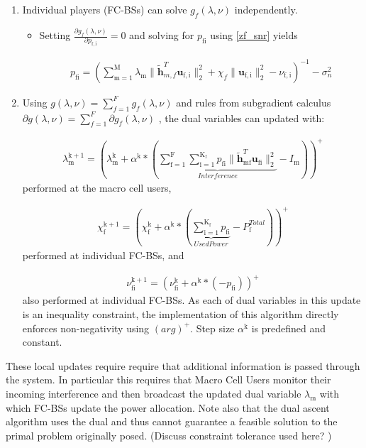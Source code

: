 \documentclass[12pt,a4paper]{report}
\begin{document}
\begin{enumerate}
\item 
Individual players (FC-BSs) can solve $ g_f(\lambda,\nu) $ independently.
\begin{itemize}
\item Setting $\frac{\partial g_f(\lambda,\nu)}{\partial p_{\mathrm{f,i}}} = 0$ 
and solving for $p_{\mathrm{fi}}$ using \eqref{zf_snr} yields

\begin{gather}
p_{\mathrm{fi}} = (\sum_{\mathrm{m=1}}^{\mathrm{M}}\lambda_{\mathrm{m}}\|\mathbf{\tilde{h}}_{m,f}^T \mathbf{u}_{\mathrm{f,i}}\|^2_2
+\chi_{f} \|\mathbf{u}_{\mathrm{f,i}}\|^2_2
-\nu_{\mathrm{f,i}}
 )^{-1}
  - \sigma^2_n
\end{gather}

\end{itemize}
\item 
Using $g(\lambda,\nu) = \sum_{f=1}^{F}g_f(\lambda,\nu)$ and rules from subgradient calculus 
$\partial g(\lambda,\nu) = \sum_{f=1}^{F} \partial g_f(\lambda,\nu)$ 
, the dual variables can updated with:

\begin{gather}
\lambda_{\mathrm{m}}^{\mathrm{k+1}} = (
\lambda_{\mathrm{m}}^{\mathrm{k}}
+
\alpha^{\mathrm{k}}*
(
\underbrace{
\sum _{\mathrm{f=1}}^{\mathrm{F}}
\sum _{\mathrm{i=1}}^{\mathrm{K_{\mathrm{f}}}}
p_{\mathrm{fi}}
\|\mathbf{\tilde{h}}_{\mathrm{mf}}^T \mathbf{u_{\mathrm{fi}}}\|^2_2}_{Interference}
- I_{\mathrm{m}}
))^+
\end{gather}
performed at the macro cell users,

\begin{gather}
\chi_{\mathrm{f}}^{\mathrm{k+1}} = (
\chi_{\mathrm{f}}^{\mathrm{k}}
+
\alpha^{\mathrm{k}}*
(\underbrace{\sum_{\mathrm{i=1}}^{\mathrm{K_{\mathrm{f}}}} p_{\mathrm{fi}}}_{Used Power} - P_{\mathrm{f}}^{Total}) )^+
\end{gather}
performed at individual FC-BSs, and 

\begin{gather}
\nu_{\mathrm{fi}}^{\mathrm{k+1}} = (
\nu_{\mathrm{fi}}^{\mathrm{k}}
+
\alpha^{\mathrm{k}}*
(-p_{\mathrm{fi}}))^+
\end{gather}
also performed at individual FC-BSs.
As each of dual variables in this update is an inequality constraint, the implementation of this algorithm directly enforces non-negativity using 
$(arg)^+$.
Step size $\alpha^{\mathrm{k}}$ is predefined and constant.



\end{enumerate} 
These local updates require require that additional information is passed through the system. In particular this requires that Macro Cell Users monitor their incoming interference and then broadcast the updated dual variable $\lambda_{\text{m}}$ with which FC-BSs update the power allocation. 
Note also that the dual ascent algorithm uses the dual and thus cannot guarantee a feasible solution to the primal problem originally posed. (Discuss constraint tolerance used here? )
\end{document}
